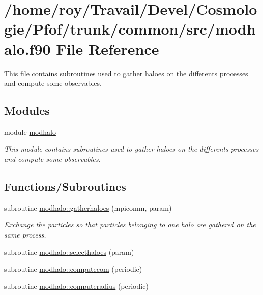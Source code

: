 \hypertarget{modhalo_8f90}{}\section{/home/roy/\+Travail/\+Devel/\+Cosmologie/\+Pfof/trunk/common/src/modhalo.f90 File Reference}
\label{modhalo_8f90}


This file contains subroutines used to gather haloes on the differents processes and compute some observables.  


\subsection*{Modules}
\begin{DoxyCompactItemize}
\item 
module \hyperlink{namespacemodhalo}{modhalo}
\begin{DoxyCompactList}\small\item\em This module contains subroutines used to gather haloes on the differents processes and compute some observables. \end{DoxyCompactList}\end{DoxyCompactItemize}
\subsection*{Functions/\+Subroutines}
\begin{DoxyCompactItemize}
\item 
subroutine \hyperlink{namespacemodhalo_acf1576354acf16b205a17c83983b248a}{modhalo\+::gatherhaloes} (mpicomm, param)
\begin{DoxyCompactList}\small\item\em Exchange the particles so that particles belonging to one halo are gathered on the same process. \end{DoxyCompactList}\item 
subroutine \hyperlink{namespacemodhalo_a4af0af98272044df8ab650e79d2516d6}{modhalo\+::selecthaloes} (param)
\item 
subroutine \hyperlink{namespacemodhalo_ac4afe524dd9d15d21ce67171c4a7ba70}{modhalo\+::computecom} (periodic)
\item 
subroutine \hyperlink{namespacemodhalo_a873e8c6a5fd11756e18c33dd7a08ab7d}{modhalo\+::computeradius} (periodic)
\end{DoxyCompactItemize}
